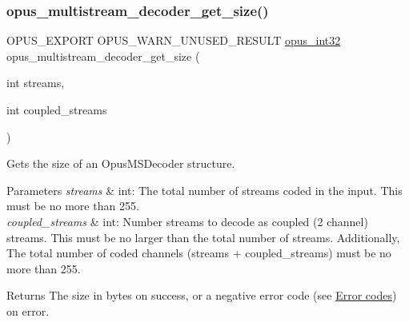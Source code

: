 \subsubsection{\texorpdfstring{opus\+\_\+multistream\+\_\+decoder\+\_\+get\+\_\+size()}{opus\_multistream\_decoder\_get\_size()}}
{\footnotesize\ttfamily O\+P\+U\+S\+\_\+\+E\+X\+P\+O\+RT O\+P\+U\+S\+\_\+\+W\+A\+R\+N\+\_\+\+U\+N\+U\+S\+E\+D\+\_\+\+R\+E\+S\+U\+LT \hyperlink{opus__types_8h_aa4d309d6f80b99dbabebc8f98879ab9a}{opus\+\_\+int32} opus\+\_\+multistream\+\_\+decoder\+\_\+get\+\_\+size (\begin{DoxyParamCaption}\item[{int}]{streams,  }\item[{int}]{coupled\+\_\+streams }\end{DoxyParamCaption})}

Gets the size of an {\ttfamily Opus\+M\+S\+Decoder} structure. 
\begin{DoxyParams}{Parameters}
{\em streams} & {\ttfamily int}\+: The total number of streams coded in the input. This must be no more than 255. \\
\hline
{\em coupled\+\_\+streams} & {\ttfamily int}\+: Number streams to decode as coupled (2 channel) streams. This must be no larger than the total number of streams. Additionally, The total number of coded channels ({\ttfamily streams + coupled\+\_\+streams}) must be no more than 255. \\
\hline
\end{DoxyParams}
\begin{DoxyReturn}{Returns}
The size in bytes on success, or a negative error code (see \hyperlink{group__opus__errorcodes}{Error codes}) on error. 
\end{DoxyReturn}
\mbox{\label{group__opus__multistream_gac9680d4205a5ea95785e747f0d2e393b}} 
